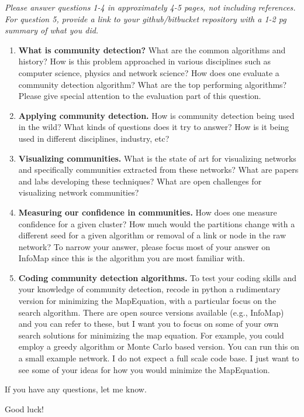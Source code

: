 \emph{Please answer questions 1-4 in approximately 4-5 pages, not
including references. For question 5, provide a link to your
github/bitbucket repository with a 1-2 pg summary of what you did.}

\begin{enumerate}
\def\labelenumi{\arabic{enumi}.}
\item
  \textbf{What is community detection?} What are the common algorithms
  and history? How is this problem approached in various disciplines
  such as computer science, physics and network science? How does one
  evaluate a community detection algorithm? What are the top performing
  algorithms? Please give special attention to the evaluation part of
  this question.
\item
  \textbf{Applying community detection.} How is community detection
  being used in the wild? What kinds of questions does it try to answer?
  How is it being used in different disciplines, industry, etc?
\item
  \textbf{Visualizing communities.} What is the state of art for
  visualizing networks and specifically communities extracted from these
  networks? What are papers and labs developing these techniques? What
  are open challenges for visualizing network communities?
\item
  \textbf{Measuring our confidence in communities.} How does one measure
  confidence for a given cluster? How much would the partitions change
  with a different seed for a given algorithm or removal of a link or
  node in the raw network? To narrow your answer, please focus most of
  your answer on InfoMap since this is the algorithm you are most
  familiar with.
\item
  \textbf{Coding community detection algorithms.} To test your coding
  skills and your knowledge of community detection, recode in python a
  rudimentary version for minimizing the MapEquation, with a particular
  focus on the search algorithm. There are open source versions
  available (e.g., InfoMap) and you can refer to these, but I want you
  to focus on some of your own search solutions for minimizing the map
  equation. For example, you could employ a greedy algorithm or Monte
  Carlo based version. You can run this on a small example network. I do
  not expect a full scale code base. I just want to see some of your
  ideas for how you would minimize the MapEquation.
\end{enumerate}

If you have any questions, let me know.

Good luck!
